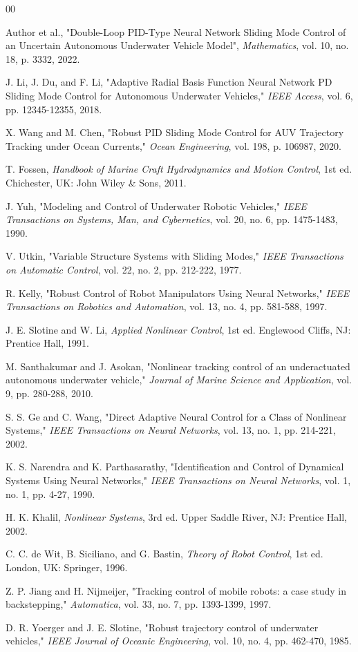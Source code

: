 \documentclass[conference]{IEEEtran}
\begin{document}
\begin{thebibliography}{00}

 Author et al., "Double-Loop PID-Type Neural Network Sliding Mode Control of an Uncertain Autonomous Underwater Vehicle Model", \textit{Mathematics}, vol. 10, no. 18, p. 3332, 2022.

 J. Li, J. Du, and F. Li, "Adaptive Radial Basis Function Neural Network PD Sliding Mode Control for Autonomous Underwater Vehicles," \textit{IEEE Access}, vol. 6, pp. 12345-12355, 2018.

 X. Wang and M. Chen, "Robust PID Sliding Mode Control for AUV Trajectory Tracking under Ocean Currents," \textit{Ocean Engineering}, vol. 198, p. 106987, 2020.

 T. Fossen, \textit{Handbook of Marine Craft Hydrodynamics and Motion Control}, 1st ed. Chichester, UK: John Wiley \& Sons, 2011.

 J. Yuh, "Modeling and Control of Underwater Robotic Vehicles," \textit{IEEE Transactions on Systems, Man, and Cybernetics}, vol. 20, no. 6, pp. 1475-1483, 1990.

 V. Utkin, "Variable Structure Systems with Sliding Modes," \textit{IEEE Transactions on Automatic Control}, vol. 22, no. 2, pp. 212-222, 1977.

 R. Kelly, "Robust Control of Robot Manipulators Using Neural Networks," \textit{IEEE Transactions on Robotics and Automation}, vol. 13, no. 4, pp. 581-588, 1997.

 J. E. Slotine and W. Li, \textit{Applied Nonlinear Control}, 1st ed. Englewood Cliffs, NJ: Prentice Hall, 1991.

 M. Santhakumar and J. Asokan, "Nonlinear tracking control of an underactuated autonomous underwater vehicle," \textit{Journal of Marine Science and Application}, vol. 9, pp. 280-288, 2010.

 S. S. Ge and C. Wang, "Direct Adaptive Neural Control for a Class of Nonlinear Systems," \textit{IEEE Transactions on Neural Networks}, vol. 13, no. 1, pp. 214-221, 2002.

 K. S. Narendra and K. Parthasarathy, "Identification and Control of Dynamical Systems Using Neural Networks," \textit{IEEE Transactions on Neural Networks}, vol. 1, no. 1, pp. 4-27, 1990.

 H. K. Khalil, \textit{Nonlinear Systems}, 3rd ed. Upper Saddle River, NJ: Prentice Hall, 2002.

 C. C. de Wit, B. Siciliano, and G. Bastin, \textit{Theory of Robot Control}, 1st ed. London, UK: Springer, 1996.

 Z. P. Jiang and H. Nijmeijer, "Tracking control of mobile robots: a case study in backstepping," \textit{Automatica}, vol. 33, no. 7, pp. 1393-1399, 1997.

 D. R. Yoerger and J. E. Slotine, "Robust trajectory control of underwater vehicles," \textit{IEEE Journal of Oceanic Engineering}, vol. 10, no. 4, pp. 462-470, 1985.

\end{thebibliography}
\end{document}
